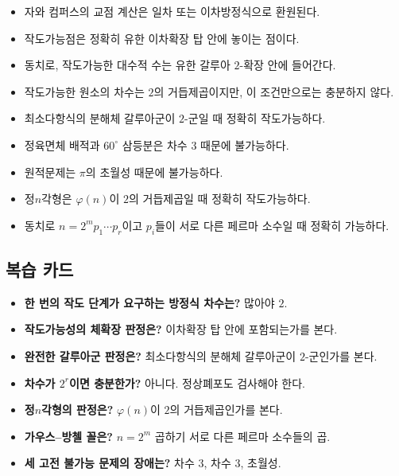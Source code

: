 \begin{chapterreview}
\begin{itemize}
  \item 자와 컴퍼스의 교점 계산은 일차 또는 이차방정식으로 환원된다.
  \item 작도가능점은 정확히 유한 이차확장 탑 안에 놓이는 점이다.
  \item 동치로, 작도가능한 대수적 수는 유한 갈루아 $2$-확장 안에 들어간다.
  \item 작도가능한 원소의 차수는 $2$의 거듭제곱이지만, 이 조건만으로는 충분하지 않다.
  \item 최소다항식의 분해체 갈루아군이 $2$-군일 때 정확히 작도가능하다.
  \item 정육면체 배적과 $60^\circ$ 삼등분은 차수 $3$ 때문에 불가능하다.
  \item 원적문제는 $\pi$의 초월성 때문에 불가능하다.
  \item 정$n$각형은 $\varphi(n)$이 $2$의 거듭제곱일 때 정확히 작도가능하다.
  \item 동치로 $n=2^m p_1\cdots p_r$이고 $p_i$들이 서로 다른 페르마 소수일 때 정확히 가능하다.
\end{itemize}
\end{chapterreview}

\subsection*{복습 카드}

\begin{itemize}
  \item \textbf{한 번의 작도 단계가 요구하는 방정식 차수는?} 많아야 $2$.
  \item \textbf{작도가능성의 체확장 판정은?} 이차확장 탑 안에 포함되는가를 본다.
  \item \textbf{완전한 갈루아군 판정은?} 최소다항식의 분해체 갈루아군이 $2$-군인가를 본다.
  \item \textbf{차수가 $2^r$이면 충분한가?} 아니다. 정상폐포도 검사해야 한다.
  \item \textbf{정$n$각형의 판정은?} $\varphi(n)$이 $2$의 거듭제곱인가를 본다.
  \item \textbf{가우스--방첼 꼴은?} $n=2^m$ 곱하기 서로 다른 페르마 소수들의 곱.
  \item \textbf{세 고전 불가능 문제의 장애는?} 차수 $3$, 차수 $3$, 초월성.
\end{itemize}
